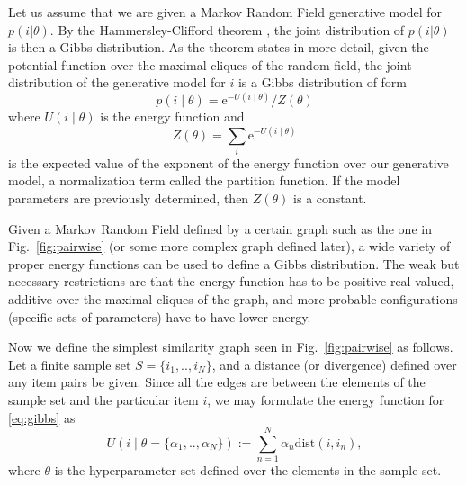 \documentclass[preprint]{sig-alternate-05-2015}
\begin{document}
Let us assume that we are given a Markov Random Field generative model for $p (i|\theta)$.
By the Hammersley-Clifford theorem \cite{hammersley1971markov}, the joint distribution of $p (i|\theta)$ is then a Gibbs distribution. 
As the theorem states in more detail, given the potential function over the maximal cliques of the random field, the joint distribution of the generative model for $i$ is a Gibbs distribution of form
%
\begin{equation}
    p(i \mid \theta) = {\mathrm{e}^{-U(i\mid \theta)}}/{Z(\theta)}
    \label{eq:gibbs}
\end{equation}
%
where $U(i\mid \theta)$ is the energy function and 
%
\begin{equation}
Z(\theta) = \sum_{i} \mathrm{e}^{-U(i \mid \theta)}
\nonumber
\end{equation}
%
is the expected value of the exponent of the energy function over our generative model, a normalization term called the partition function.  If the model parameters are previously determined, then $Z(\theta)$ is a constant. 

Given a Markov Random Field defined by a certain graph such as the one in Fig.~\ref{fig:pairwise} (or some more complex graph defined later), a wide variety of proper energy functions can be used to define a Gibbs distribution. The weak but necessary restrictions are that the energy function has to be positive real valued, additive over the maximal cliques of the graph, and more probable configurations (specific sets of parameters) have to have lower energy. 

Now we define the simplest similarity graph seen in Fig.~\ref{fig:pairwise} as follows.  Let a finite sample set $S=\{i_1,..,i_{N}\}$, and a distance (or divergence) defined over any item pairs be given.  Since all the edges are between the elements of the sample set and the particular item $i$, we may formulate the energy function for \eqref{eq:gibbs} as
%
\begin{equation}
U(i \mid \theta=\{\alpha_1,..,\alpha_{N}\}) := \sum_{n=1}^{N} \alpha_n \mbox{dist}(i,i_n),
\label{eq:potential}
\end{equation}
where $\theta$ is the hyperparameter set defined over the elements in the sample set. 
\end{document}
